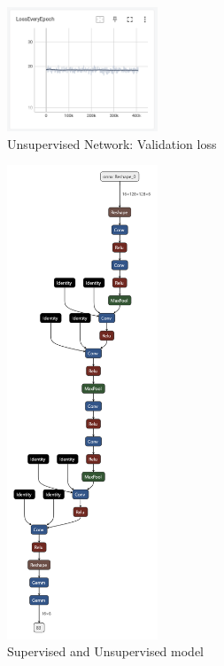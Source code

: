 \documentclass[conference]{IEEEtran}
\begin{document}
\begin{figure}[!htbp]
  \centering
  \includegraphics[width=0.4\textwidth]{phase1/unsup_validation_loss.png}
  \caption{Unsupervised Network: Validation loss}
  \label{fig: unsupervised_validation_loss}
\end{figure}


\begin{figure}[!htbp]
  \centering
  \includegraphics[width=0.4\textwidth]{phase1/homography_supervised.pt.png}
  \caption{Supervised and Unsupervised model}
  \label{model:supervised}
\end{figure}
\end{document}
